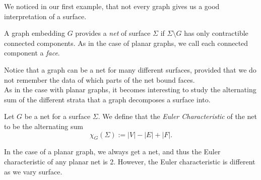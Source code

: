 We  noticed in our first example, that not every graph gives us a good interpretation of a surface.  
\begin{definition}
A graph embedding $G$ provides a \emph{net} of surface $\Sigma$ if $\Sigma\setminus G$ has only contractible connected components. As in the case of planar graphs, we call each connected component a \emph{face}. 
\end{definition}
Notice that a graph can be a net for many different surfaces, provided that we do not remember the data of which parts of the net bound faces.  \\
As in the case with planar graphs, it becomes interesting to study the alternating sum of the different strata that a graph decomposes a surface into. 
\begin{definition}
Let $G$ be a net for a surface $\Sigma$. We define that the \emph{Euler Characteristic} of the net to be the alternating sum
\[\chi_G(\Sigma):= |V|-|E|+|F|.\]
\end{definition}
In the case of a planar graph, we always get a net, and thus the Euler characteristic of any planar net is 2. However, the Euler characteristic is different as we vary surface. 

